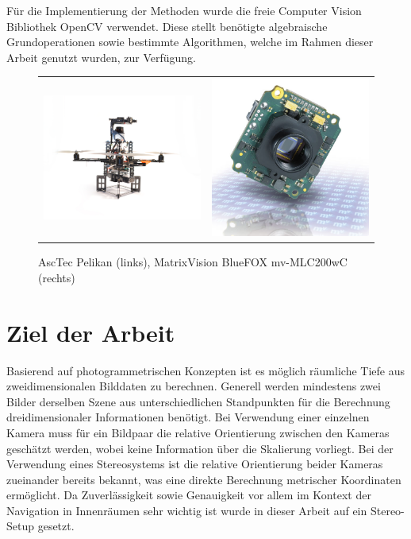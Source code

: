 \noindent
Für die Implementierung der Methoden wurde die freie Computer Vision Bibliothek OpenCV \cite{opencv} verwendet. Diese stellt benötigte algebraische Grundoperationen sowie bestimmte Algorithmen, welche im Rahmen dieser Arbeit genutzt wurden, zur Verfügung.
\begin{figure}[h]
	\centering
	\begin{tabular}{cc}
	\includegraphics[width=6cm]{img/pelican} &
	\includegraphics[width=6cm]{img/camera}
	\end{tabular}
	\caption{AscTec Pelikan (links), MatrixVision BlueFOX mv-MLC200wC (rechts)}
	\label{img:pelican}
\end{figure}


\section{Ziel der Arbeit}
\label{sec:ziel_der_arbeit}
Basierend auf photogrammetrischen Konzepten ist es möglich räumliche Tiefe aus zweidimensionalen Bilddaten zu berechnen. Generell werden mindestens zwei Bilder derselben Szene aus unterschiedlichen Standpunkten für die Berechnung dreidimensionaler Informationen benötigt. Bei Verwendung einer einzelnen Kamera muss für ein Bildpaar die relative Orientierung zwischen den Kameras geschätzt werden, wobei keine Information über die Skalierung vorliegt. Bei der Verwendung eines Stereosystems ist die relative Orientierung beider Kameras zueinander bereits bekannt, was eine direkte Berechnung metrischer Koordinaten ermöglicht. Da Zuverlässigkeit sowie Genauigkeit vor allem im Kontext der Navigation in Innenräumen sehr wichtig ist wurde in dieser Arbeit auf ein Stereo-Setup gesetzt.\\

